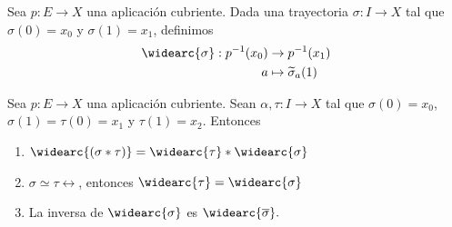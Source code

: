 \begin{definicion}
    Sea $p:E\to X$ una aplicación cubriente. Dada una trayectoria $\sigma:I\to X$ tal que $\sigma(0)=x_0$ y $\sigma(1)=x_1$, definimos  
    \begin{align*}
        \widearc{\sigma}:p^{-1}(x_0)&\to p^{-1}(x_1)\\
        a&\mapsto \widetilde{\sigma}_a(1)
    \end{align*}
\end{definicion}
\begin{lema}
    \label{lema: lema_A_cubrientes}
    Sea $p:E\to X$ una aplicación cubriente. Sean $\alpha,\tau:I\to X$ tal que $\sigma(0)=x_0$, $\sigma(1)=\tau(0)=x_1$ y $\tau(1)=x_2$. Entonces
    \begin{enumerate}
        \item[(1)] $\widearc{(\sigma*\tau)}=\widearc{\tau}*\widearc{\sigma}$
        \item[(2)] $\sigma\simeq\tau\rel$, entonces $\widearc{\tau}=\widearc{\sigma}$ 
        \item[(3)] La inversa de $\widearc{\sigma}$ es $\widearc{\overline{\sigma}}.$
    \end{enumerate}
\end{lema}
